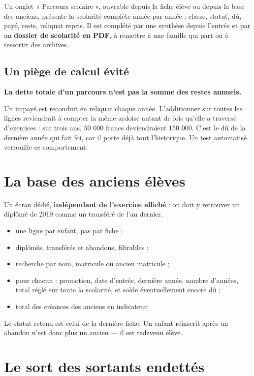 \documentclass[11pt,a4paper]{report}
\newcommand{\encadre}[2]{%
  \begingroup
  \setlength{\fboxsep}{9pt}%
  \noindent\colorbox{sagibg}{%
    \begin{minipage}{\dimexpr\linewidth-2\fboxsep\relax}
    \textbf{\color{#1}#2}
    \end{minipage}}%
  \par\vspace{8pt}
  \endgroup}
\newcommand{\alerte}[1]{\encadre{sagired}{#1}}
\begin{document}
Un onglet « Parcours scolaire », ouvrable depuis la fiche élève ou depuis la
base des anciens, présente la scolarité complète année par année : classe,
statut, dû, payé, reste, reliquat repris. Il est complété par une synthèse
depuis l'entrée et par un \textbf{dossier de scolarité en PDF}, à remettre à
une famille qui part ou à ressortir des archives.

\subsection{Un piège de calcul évité}

\alerte{La dette totale d'un parcours n'est pas la somme des restes annuels.}

Un impayé est reconduit en reliquat chaque année. L'additionner sur toutes les
lignes reviendrait à compter la même ardoise autant de fois qu'elle a traversé
d'exercices : sur trois ans, 50 000 francs deviendraient 150 000. C'est le dû
de la dernière année qui fait foi, car il porte déjà tout l'historique. Un test
automatisé verrouille ce comportement.

\section{La base des anciens élèves}

Un écran dédié, \textbf{indépendant de l'exercice affiché} : on doit y
retrouver un diplômé de 2019 comme un transféré de l'an dernier.

\begin{itemize}
\item une ligne par enfant, pas par fiche ;
\item diplômés, transférés et abandons, filtrables ;
\item recherche par nom, matricule ou ancien matricule ;
\item pour chacun : promotion, date d'entrée, dernière année, nombre d'années,
      total réglé sur toute la scolarité, et solde éventuellement encore dû ;
\item total des créances des anciens en indicateur.
\end{itemize}

Le statut retenu est celui de la dernière fiche. Un enfant réinscrit après un
abandon n'est donc plus un ancien --- il est redevenu élève.

\section{Le sort des sortants endettés}
\end{document}
